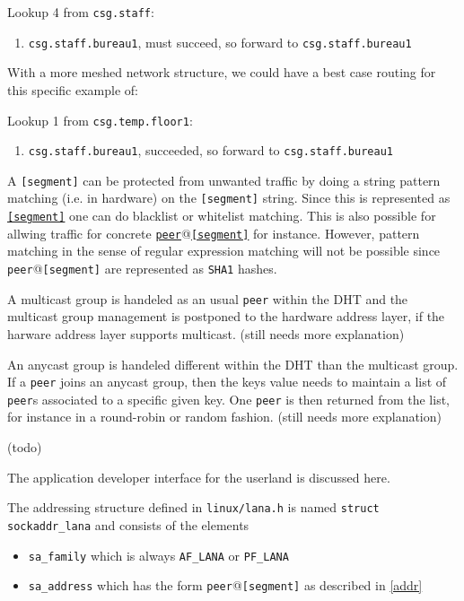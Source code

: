 \documentclass[times,10pt,twocolumn]{article}
\begin{document}
Lookup 4 from \texttt{csg.staff}:
\begin{enumerate}
	\item \texttt{csg.staff.bureau1}, must succeed, so forward to \texttt{csg.staff.bureau1}
\end{enumerate}

With a more meshed network structure, we could have a best case routing for this specific example
of:\newline

Lookup 1 from \texttt{csg.temp.floor1}:
\begin{enumerate}
	\item \texttt{csg.staff.bureau1}, succeeded, so forward to \texttt{csg.staff.bureau1}
\end{enumerate}

A \texttt{[segment]} can be protected from unwanted traffic by doing a
string pattern matching (i.e. in hardware) on the \texttt{[segment]}
string. Since this is represented as \underline{\texttt{[segment]}} one
can do blacklist or whitelist matching. This is also possible for allwing
traffic for concrete \underline{\texttt{peer}}@\underline{\texttt{[segment]}}
for instance. However, pattern matching in the sense of regular expression
matching will not be possible since \texttt{peer}@\texttt{[segment]} are
represented as \texttt{SHA1} hashes.

A multicast group is handeled as an usual \texttt{peer} within the DHT and the 
multicast group management is postponed to the hardware address layer, if the harware 
address layer supports multicast. (still needs more explanation)

An anycast group is handeled different within the DHT than the multicast group. If 
a \texttt{peer} joins an anycast group, then the keys value needs to maintain a list
of \texttt{peer}s associated to a specific given key. One \texttt{peer} is then returned
from the list, for instance in a round-robin or random fashion. (still needs more explanation)

(todo)

The application developer interface for the userland is discussed here.

The addressing structure defined in \texttt{linux/lana.h} is named
\texttt{struct sockaddr\_lana} and consists of the elements
\begin{itemize}
	\setlength{\itemsep}{-1mm}
	\item \texttt{sa\_family} which is always \texttt{AF\_LANA} or \texttt{PF\_LANA}
	\item \texttt{sa\_address} which has the form
	      \texttt{peer}@\texttt{[segment]} as described in \ref{addr}
\end{itemize}
\end{document}
